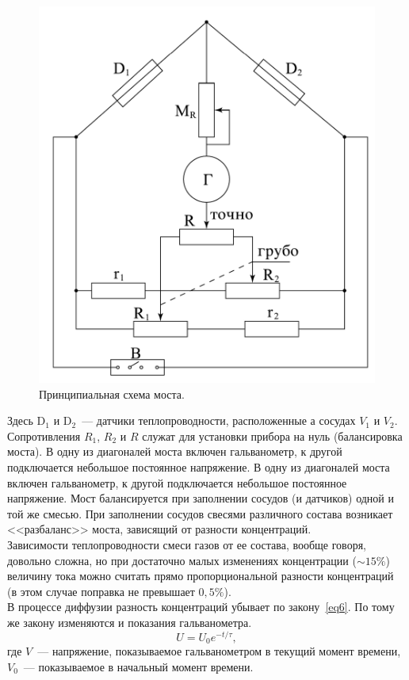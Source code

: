 \documentclass[a4paper,11pt]{article}
\begin{document}
\begin{figure}\label{fig:img2}
  \centering
  \includegraphics[scale = 0.2]{scheme2.png}
  \caption{Принципиальная схема моста.}
\end{figure}
Здесь D$_{1}$ и D$_{2}$~--- датчики теплопроводности, расположенные а сосудах $V_{1}$ и $V_{2}$. Сопротивления $R_{1}$, $R_{2}$ и $R$ служат для установки прибора на нуль (балансировка моста). В одну из диагоналей моста включен гальванометр, к другой подключается небольшое постоянное напряжение. В одну из диагоналей моста включен гальванометр, к другой подключается небольшое постоянное напряжение. Мост балансируется при заполнении сосудов (и датчиков) одной и той же смесью. При заполнении сосудов свесями различного состава возникает <<разбаланс>> моста, зависящий от разности концентраций.\\
Зависимости теплопроводности смеси газов от ее состава, вообще говоря, довольно сложна, но при достаточно малых изменениях концентрации ($\sim 15\%$) величину тока можно считать прямо пропорциональной разности концентраций (в этом случае поправка не превышает $0,5\%$).\\
В процессе диффузии разность концентраций убывает по закону~\ref{eq6}. По тому же закону изменяются и показания гальванометра.
\begin{equation}\label{eq9}
  U = U_{0} e^{-t/\tau},
\end{equation}
где $V$~--- напряжение, показываемое гальванометром в текущий момент времени, $V_{0}$~--- показываемое в начальный момент времени.
\end{document}
